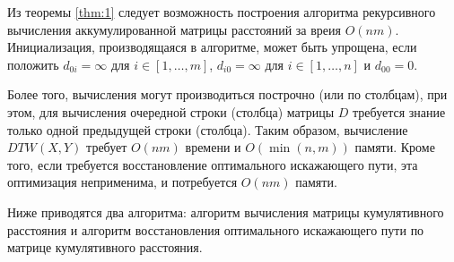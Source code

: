 \documentclass[a4paper, 14pt]{extarticle}
\numberwithin{figure}{subsection}
\numberwithin{equation}{subsection}
\begin{document}
Из теоремы \ref{thm:1} следует возможность построения алгоритма рекурсивного вычисления аккумулированной матрицы расстояний за вреия $O(nm)$. Инициализация, производящаяся в алгоритме, может быть упрощена, если положить $d_{0 i} = \infty$ для $i \in [1, \dots, m]$, $d_{i 0} = \infty$ для $i \in [1, \dots, n]$ и $d_{0 0} = 0.$

Более того, вычисления могут производиться построчно (или по столбцам), при этом, для вычисления очередной строки (столбца) матрицы $D$ требуется знание только одной предыдущей строки (столбца). Таким образом, вычисление $DTW(X, Y)$ требует $O(nm)$ времени и $O(\min(n,m))$ памяти. Кроме того, если требуется восстановление оптимального искажающего пути, эта оптимизация неприменима, и потребуется $O(nm)$ памяти.

Ниже приводятся два алгоритма: алгоритм вычисления матрицы кумулятивного расстояния и алгоритм восстановления оптимального искажающего пути по матрице кумулятивного расстояния.
\end{document}
